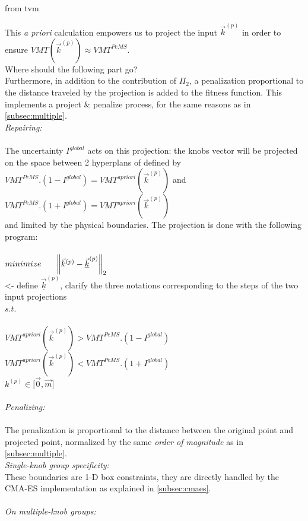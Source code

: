 \color{red} from tvm \color{black}





This \emph{a priori} calculation empowers us to project the input $\vec{k}^{(p)}$ in order to ensure $VMT(\vec{k}^{(p)})\approx VMT^{PeMS}$.\\

\color{red} Where should the following part go? \color{black}\\
Furthermore, in addition to the contribution of $\Pi_{2}$, a penalization proportional to the distance traveled by the projection is added to the fitness function. This implements a project \& penalize process, for the same reasons as in \ref{subsec:multiple}.\\
\emph{Repairing:}\\
\\
The uncertainty $I^{global}$ acts on this projection: the knobs vector will be projected on the space between 2 hyperplans of   defined by\\
$VMT^{PeMS}.(1-I^{global})=VMT^{apriori}(\vec{k}^{(p)})$ and\\
$VMT^{PeMS}.(1+I^{global})=VMT^{apriori}(\vec{k}^{(p)})$\\
and limited by the physical boundaries.
The projection is done with the following program:\\
\\
$minimize \ \ \ \ \ \norm{\vec{k}^{(p)}-\underline{\vec{k}}^{(p)}}_{2}$\\ \color{red}<- define $\underline{\vec{k}}^{(p)}$, clarify the three notations corresponding to the steps of the two input projections\color{black}\\
$s.t.$\\
\\
$VMT^{apriori}(\vec{k}^{(p)})>VMT^{PeMS}.(1-I^{global})$\\
$VMT^{apriori}(\vec{k}^{(p)})<VMT^{PeMS}.(1+I^{global})$\\
$k^{(p)}\in{[\vec{0},\vec{m}}]$\\
\\
\emph{Penalizing:}\\
\\
The penalization is proportional to the distance between the original point and projected point, normalized by the same \emph{order of magnitude} as in \ref{subsec:multiple}.\\

\emph{Single-knob group specificity:}\\
These boundaries are 1-D box constraints, they are directly handled by the CMA-ES implementation as explained in \ref{subsec:cmaes}.\\
\\
\emph{On multiple-knob groups:}\\